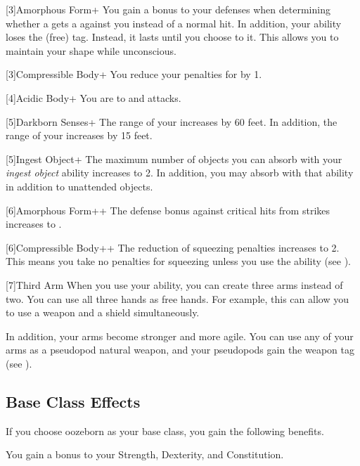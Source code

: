    [3]{Amorphous Form+} You gain a  bonus to your defenses when determining whether a  gets a  against you instead of a normal hit.
      In addition, your  ability loses the  (free) tag.
      Instead, it lasts until you choose to  it.
      This allows you to maintain your shape while unconscious.

    [3]{Compressible Body+} You reduce your penalties for \squeezing by 1.

    [4]{Acidic Body+} You are  to \atAcid and \atPoison attacks.

    [5]{Darkborn Senses+} The range of your  increases by 60 feet.
      In addition, the range of your  increases by 15 feet.

    [5]{Ingest Object+} The maximum number of objects you can absorb with your \textit{ingest object} ability increases to 2.
      In addition, you may absorb  with that ability in addition to unattended objects.

    [6]{Amorphous Form++} The defense bonus against critical hits from strikes increases to .

    [6]{Compressible Body++} The reduction of squeezing penalties increases to 2.
      This means you take no penalties for squeezing unless you use the  ability (see ).

    [7]{Third Arm} When you use your  ability, you can create three arms instead of two.
      You can use all three hands as free hands.
      For example, this can allow you to use a  weapon and a shield simultaneously.

      In addition, your arms become stronger and more agile.
      You can use any of your arms as a pseudopod natural weapon, and your pseudopods gain the  weapon tag (see ).

  \subsection{Base Class Effects}
    If you choose oozeborn as your base class, you gain the following benefits.

      You gain a  bonus to your Strength, Dexterity, and Constitution.

